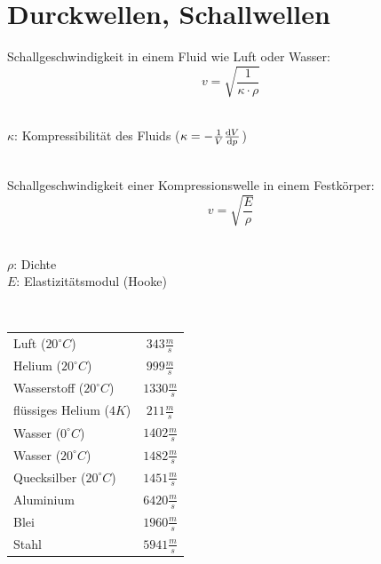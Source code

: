 \section{Durckwellen, Schallwellen}
Schallgeschwindigkeit in einem Fluid wie Luft oder Wasser:
\[\boxed{
	v = \sqrt{\frac{1}{\kappa \cdot \rho}}
}\]
\\
\begin{footnotesize}
	$\kappa$: Kompressibilität des Fluids ($\kappa=-\frac{1}{V} \frac{\mathrm{d} V}{\mathrm{d} p}$)\\
\end{footnotesize}
\\
Schallgeschwindigkeit einer Kompressionswelle in einem Festkörper:
\[\boxed{
	v = \sqrt{\frac{E}{\rho}}
}\]
\\
\begin{footnotesize}
	$\rho$: Dichte\\
	$E$: Elastizitätsmodul (Hooke)\\
\end{footnotesize}
\\
\noindent
\begin{tabular}{|lc|}
\hline
\rowcolor{white}Luft  ($20^\circ C$) 		& $343 \frac{m}{s}$ \\ 
\rowcolor{lgray}Helium  ($20^\circ C$) 		& $999 \frac{m}{s}$ \\ 
\rowcolor{white}Wasserstoff  ($20^\circ C$) & $1330 \frac{m}{s}$ \\ 
\rowcolor{lgray}flüssiges Helium ($4K$) 	& $211 \frac{m}{s}$ \\ 
\rowcolor{white}Wasser  ($0^\circ C$) 		& $1402 \frac{m}{s}$ \\ 
\rowcolor{lgray}Wasser  ($20^\circ C$) 		& $1482 \frac{m}{s}$ \\ 
\rowcolor{white}Quecksilber  ($20^\circ C$) & $1451 \frac{m}{s}$ \\ 
\rowcolor{lgray}Aluminium 					& $6420 \frac{m}{s}$ \\ 
\rowcolor{white}Blei 						& $1960 \frac{m}{s}$ \\ 
\rowcolor{lgray}Stahl 						& $5941 \frac{m}{s}$ \\ 
\hline
\end{tabular} 


